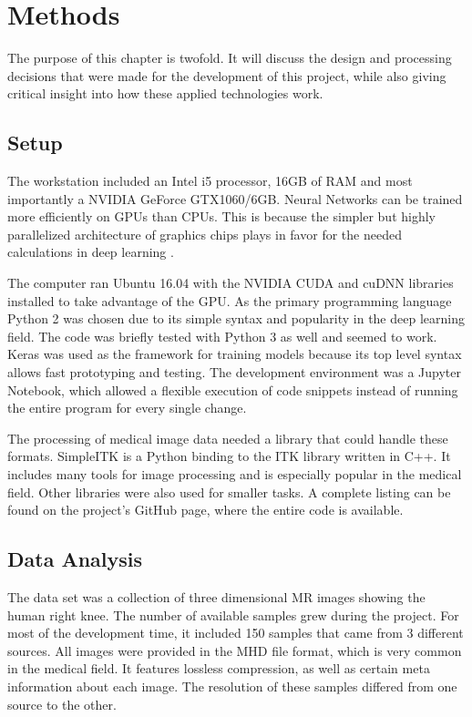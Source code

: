 \section{Methods}

The purpose of this chapter is twofold. It will discuss the design and processing decisions that were made for the development of this project, while also giving critical insight into how these applied technologies work.

\subsection{Setup}

The workstation included an Intel i5 processor, 16GB of RAM and most importantly a NVIDIA GeForce GTX1060/6GB. Neural Networks can be trained more efficiently on GPUs than CPUs. This is because the simpler but highly parallelized architecture of graphics chips plays in favor for the needed calculations in deep learning \cite{NVIDIA}.

The computer ran Ubuntu 16.04 with the NVIDIA CUDA and cuDNN libraries installed to take advantage of the GPU. As the primary programming language Python 2 was chosen due to its simple syntax and popularity in the deep learning field. The code was briefly tested with Python 3 as well and seemed to work. Keras was used as the framework for training models because its top level syntax allows fast prototyping and testing. The development environment was a Jupyter Notebook, which allowed a flexible execution of code snippets instead of running the entire program for every single change.

The processing of medical image data needed a library that could handle these formats. SimpleITK is a Python binding to the ITK library written in C++. It includes many tools for image processing and is especially popular in the medical field. Other libraries were also used for smaller tasks. A complete listing can be found on the project's GitHub page, where the entire code is available.

\subsection{Data Analysis}

The data set was a collection of three dimensional MR images showing the human right knee. The number of available samples grew during the project. For most of the development time, it included 150 samples that came from 3 different sources. All images were provided in the MHD file format, which is very common in the medical field. It features lossless compression, as well as certain meta information about each image. The resolution of these samples differed from one source to the other.

